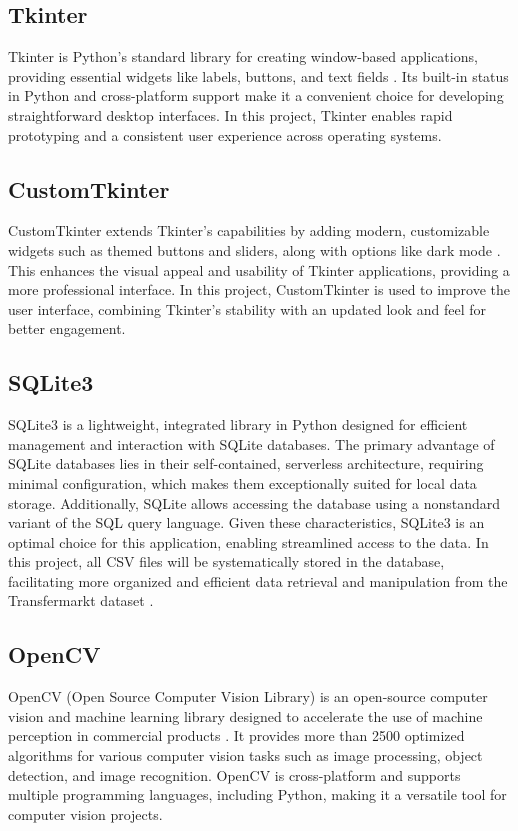 \documentclass{article}
\begin{document}
\subsection{Tkinter}
Tkinter is Python’s standard library for creating window-based applications, providing essential widgets like labels, buttons, and text fields \cite{Tkinter}. Its built-in status in Python and cross-platform support make it a convenient choice for developing straightforward desktop interfaces. In this project, Tkinter enables rapid prototyping and a consistent user experience across operating systems.

\subsection{CustomTkinter}

CustomTkinter extends Tkinter’s capabilities by adding modern, customizable widgets such as themed buttons and sliders, along with options like dark mode \cite{CustomTkinter}. This enhances the visual appeal and usability of Tkinter applications, providing a more professional interface. In this project, CustomTkinter is used to improve the user interface, combining Tkinter’s stability with an updated look and feel for better engagement.

\subsection{SQLite3}
SQLite3 is a lightweight, integrated library in Python designed for efficient management and interaction with SQLite databases. The primary advantage of SQLite databases lies in their self-contained, serverless architecture, requiring minimal configuration, which makes them exceptionally suited for local data storage. Additionally, SQLite allows accessing the database using a nonstandard variant of the SQL query language.\cite{SQLite3} Given these characteristics, SQLite3 is an optimal choice for this application, enabling streamlined access to the data. In this project, all CSV files  will be systematically stored in the database, facilitating more organized and efficient data retrieval and manipulation from the Transfermarkt dataset \cite{Davidcariboo}. 

\subsection{OpenCV}

OpenCV (Open Source Computer Vision Library) is an open-source computer vision and machine learning library designed to accelerate the use of machine perception in commercial products \cite{OpenCV}. It provides more than 2500 optimized algorithms for various computer vision tasks such as image processing, object detection, and image recognition. OpenCV is cross-platform and supports multiple programming languages, including Python, making it a versatile tool for computer vision projects.\vspace{0.5em}
\end{document}
